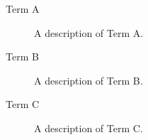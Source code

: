 \begin{description}
  \item[Term A] A description of Term A.
  \item[Term B] A description of Term B.
  \item[Term C] A description of Term C.
\end{description}